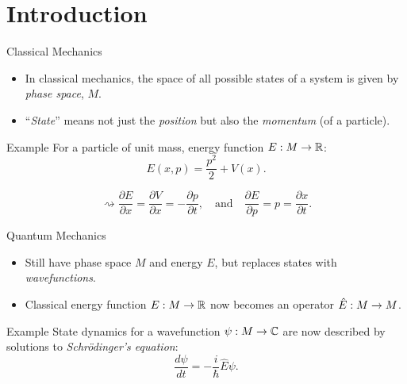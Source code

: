 \section{Introduction}

\begin{frame}{Classical Mechanics}

    \begin{itemize}
        \item In classical mechanics, the space of all possible states of a system is given by \emph{phase space}, $M$.
        \item ``\emph{State}'' means not just the \emph{position} but also the \emph{momentum} (of a particle).
    \end{itemize}
    
    \begin{block}{Example}
        For a particle of unit mass, energy function $E : M \rightarrow \mathbb{R}$:
        \begin{equation*}
            E(x,p) = \frac{p^{2}}{2} + V(x).
        \end{equation*}
    \end{block}

    \begin{equation*}
        \rightsquigarrow \frac{\partial E}{\partial x} = \frac{\partial V}{\partial x} = -\frac{\partial p}{\partial t}, \quad \text{and} \quad \frac{\partial E}{\partial p} = p = \frac{\partial x}{\partial t}.
    \end{equation*}

\end{frame}

\begin{frame}{Quantum Mechanics}

    \begin{itemize}
        \item Still have phase space $M$ and energy $E$, but replaces states with \emph{wavefunctions}.
        \item Classical energy function $E : M \rightarrow \mathbb{R}$ now becomes an operator $\hat{E} : M \rightarrow M$.
    \end{itemize}

    \begin{block}{Example}
        State dynamics for a wavefunction $\psi: M \rightarrow \mathbb{C}$ are now described by solutions to \emph{Schrödinger's equation}:
        \begin{equation*}
            \frac{d\psi}{dt} = -\frac{i}{\hbar}\hat{E}\psi.
        \end{equation*}
    \end{block}

\end{frame}